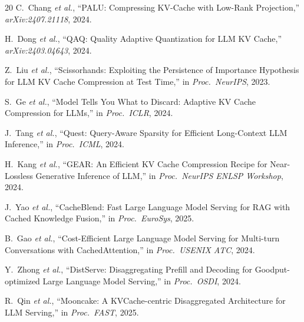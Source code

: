 \documentclass[conference]{IEEEtran}
\newcommand{\etal}{\textit{et al.}\xspace}
\begin{document}
\begin{thebibliography}{20}
C.~Chang \etal, ``PALU: Compressing KV-Cache with Low-Rank Projection,'' \emph{arXiv:2407.21118}, 2024.

H.~Dong \etal, ``QAQ: Quality Adaptive Quantization for LLM KV Cache,'' \emph{arXiv:2403.04643}, 2024.

Z.~Liu \etal, ``Scissorhands: Exploiting the Persistence of Importance Hypothesis for LLM KV Cache Compression at Test Time,'' in \emph{Proc.\ NeurIPS}, 2023.

S.~Ge \etal, ``Model Tells You What to Discard: Adaptive KV Cache Compression for LLMs,'' in \emph{Proc.\ ICLR}, 2024.

J.~Tang \etal, ``Quest: Query-Aware Sparsity for Efficient Long-Context LLM Inference,'' in \emph{Proc.\ ICML}, 2024.

H.~Kang \etal, ``GEAR: An Efficient KV Cache Compression Recipe for Near-Lossless Generative Inference of LLM,'' in \emph{Proc.\ NeurIPS ENLSP Workshop}, 2024.

J.~Yao \etal, ``CacheBlend: Fast Large Language Model Serving for RAG with Cached Knowledge Fusion,'' in \emph{Proc.\ EuroSys}, 2025.

B.~Gao \etal, ``Cost-Efficient Large Language Model Serving for Multi-turn Conversations with CachedAttention,'' in \emph{Proc.\ USENIX ATC}, 2024.

Y.~Zhong \etal, ``DistServe: Disaggregating Prefill and Decoding for Goodput-optimized Large Language Model Serving,'' in \emph{Proc.\ OSDI}, 2024.

R.~Qin \etal, ``Mooncake: A KVCache-centric Disaggregated Architecture for LLM Serving,'' in \emph{Proc.\ FAST}, 2025.

\end{thebibliography}
\end{document}
